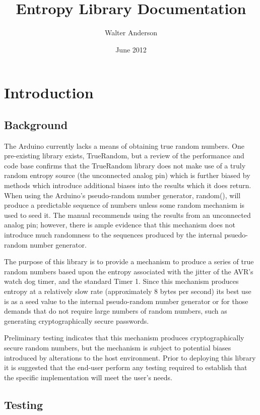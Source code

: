 \documentclass[10pt]{report}
\title{Entropy Library Documentation}
\author{Walter Anderson}
\date{June 2012}
\begin{document}
\maketitle
\tableofcontents
\chapter{Introduction}
\setcounter{page}{1}
\section{Background}

The Arduino currently lacks a means of obtaining true random numbers.  One pre-existing library exists, TrueRandom, but a review of the performance and code 
base confirms that the TrueRandom library does not make use of a truly random entropy source (the unconnected analog pin) \cite{Krisston2011} which is further biased by methods
which introduce additional biases into the results which it does return.  When using the Arduino's pseudo-random number generator, random(), will produce a 
predictable sequence of numbers unless some random mechanism is used to seed it.  The manual recommends using the results from an unconnected analog pin; 
however, there is ample evidence that this mechanism does not introduce much randomness to the sequences produced by the internal psuedo-random number generator.

The purpose of this library is to provide a mechanism to produce a series of true random numbers based upon the entropy associated with the jitter of the 
AVR's watch dog timer, and the standard Timer 1. \cite{Pedersen2006} Since this mechanism produces entropy at a relatively slow rate (approximately 8 bytes per second) its best use
is as a seed value to the internal pseudo-random number generator or for those demands that do not require large numbers of random numbers, such as generating
cryptographically secure passwords. \cite{Hlavac2010}

Preliminary testing indicates that this mechanism produces cryptographically secure random numbers, but the mechanism is subject to potential biases introduced by
alterations to the host environment.  Prior to deploying this library it is suggested that the end-user perform any testing required to establish that the specific
implementation will meet the user's needs.

\section{Testing}
\end{document}
